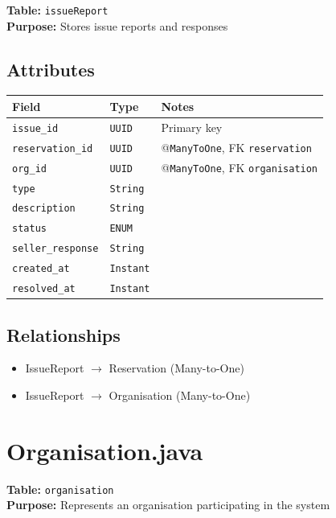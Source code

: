 \documentclass[a4paper,11pt]{article}
\begin{document}
\textbf{Table:} \texttt{issueReport} \\
\textbf{Purpose:} Stores issue reports and responses \\

\subsection*{Attributes}
\begin{longtable}{|p{4cm}|p{3cm}|p{6cm}|}
\hline
\textbf{Field} & \textbf{Type} & \textbf{Notes} \\
\hline
\texttt{issue\_id} & \texttt{UUID} & Primary key \\
\texttt{reservation\_id} & \texttt{UUID} & @\texttt{ManyToOne}, FK \texttt{reservation} \\
\texttt{org\_id} & \texttt{UUID} & @\texttt{ManyToOne}, FK \texttt{organisation} \\
\texttt{type} & \texttt{String} & \\
\texttt{description} & \texttt{String} &  \\
\texttt{status} & \texttt{ENUM} & \\
\texttt{seller\_response} &  \texttt{String} & \\
\texttt{created\_at} & \texttt{Instant} &  \\
\texttt{resolved\_at} & \texttt{Instant} &  \\
\hline
\end{longtable}

\subsection*{Relationships}
\begin{itemize}
  \item IssueReport $\rightarrow$ Reservation (Many-to-One)
  \item IssueReport $\rightarrow$ Organisation (Many-to-One)
\end{itemize}


\section{Organisation.java}

\textbf{Table:} \texttt{organisation} \\
\textbf{Purpose:} Represents an organisation participating in the system
\end{document}

